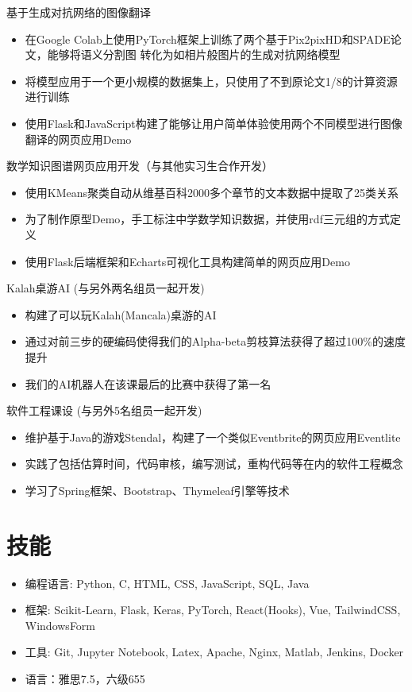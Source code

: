 \documentclass{resume}
\begin{document}
基于生成对抗网络的图像翻译
\begin{itemize}
    \item 在Google Colab上使用PyTorch框架上训练了两个基于Pix2pixHD和SPADE论文，能够将语义分割图
    转化为如相片般图片的生成对抗网络模型
    \item 将模型应用于一个更小规模的数据集上，只使用了不到原论文1/8的计算资源进行训练
    \item 使用Flask和JavaScript构建了能够让用户简单体验使用两个不同模型进行图像翻译的网页应用Demo
\end{itemize}


数学知识图谱网页应用开发（与其他实习生合作开发）
\begin{itemize}
    \item 使用KMeans聚类自动从维基百科2000多个章节的文本数据中提取了25类关系
    \item 为了制作原型Demo，手工标注中学数学知识数据，并使用rdf三元组的方式定义
    \item 使用Flask后端框架和Echarts可视化工具构建简单的网页应用Demo
\end{itemize}


Kalah桌游AI (与另外两名组员一起开发)
\begin{itemize}
    \item 构建了可以玩Kalah(Mancala)桌游的AI
    \item 通过对前三步的硬编码使得我们的Alpha-beta剪枝算法获得了超过100\%的速度提升
    \item 我们的AI机器人在该课最后的比赛中获得了第一名
\end{itemize}

软件工程课设 (与另外5名组员一起开发)
\begin{itemize}
    \item 维护基于Java的游戏Stendal，构建了一个类似Eventbrite的网页应用Eventlite
    \item 实践了包括估算时间，代码审核，编写测试，重构代码等在内的软件工程概念
    \item 学习了Spring框架、Bootstrap、Thymeleaf引擎等技术
\end{itemize}

\section{技能}
\begin{itemize}[parsep=0.5ex]
    \item 编程语言: Python, C, HTML, CSS, JavaScript, SQL, Java
    \item 框架: Scikit-Learn, Flask, Keras, PyTorch, React(Hooks), Vue, TailwindCSS, WindowsForm
    \item 工具: Git, Jupyter Notebook, Latex, Apache, Nginx, Matlab, Jenkins, Docker
    \item 语言：雅思7.5，六级655
\end{itemize}
\end{document}
